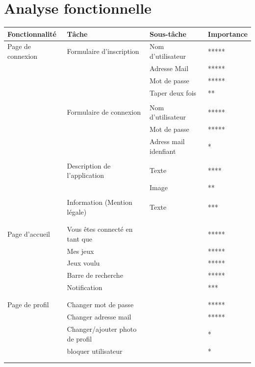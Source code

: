 \documentclass[a4paper,12pt,abstracton,titlepage]{scrartcl}
\begin{document}
\newpage
\section{Analyse fonctionnelle}
\begin{longtable}{|p{}|p{}|p{}|l|}
\hline
\textbf{Fonctionnalité} & \textbf{Tâche} & \textbf{Sous-tâche} & \textbf{Importance}\\
\hline
Page de connexion & Formulaire d'inscription & Nom d'utilisateur & *****\\
 \hline
 & & Adresse Mail & *****\\
 \hline
 & & Mot de passe & *****\\
 \hline
 & & Taper deux fois & **\\
 \hline
 & & & \\
 \hline
 & Formulaire de connexion & Nom d'utilisateur & *****\\
 \hline
 & & Mot de passe & *****\\
 \hline
 & & Adress mail idenfiant & * \\
 \hline
  & & & \\
 \hline	
 & Description de l'application & Texte & ****\\
 \hline
 & & Image & **\\
 \hline
  & & & \\
 \hline
  & Information (Mention légale) &  Texte & ***\\
 \hline
 & & & \\
 \hline
 & & & \\
 \hline
Page d'accueil & Vous êtes connecté en tant que & & *****\\
 \hline
& Mes jeux & & *****\\
 \hline
& Jeux voulu & & *****\\
 \hline
& Barre de recherche & & *****\\
 \hline
& Notification & & ***\\
 \hline
  & & & \\
 \hline
 & & & \\
 \hline
Page de profil & Changer mot de passe & & *****\\
 \hline
 & Changer adresse mail & & *****\\
 \hline
 & Changer/ajouter photo de profil & & *\\
 \hline
 & bloquer utilisateur & & *\\
 \hline
 & & & \\
 \hline
 & & & \\

\end{longtable}
\end{document}
